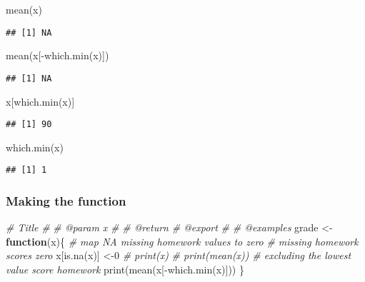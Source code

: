 \documentclass[
]{article}
\newenvironment{Shaded}{\begin{snugshade}}{\end{snugshade}}
\newcommand{\CommentTok}[1]{\textcolor[rgb]{0.56,0.35,0.01}{\textit{#1}}}
\newcommand{\ControlFlowTok}[1]{\textcolor[rgb]{0.13,0.29,0.53}{\textbf{#1}}}
\newcommand{\DecValTok}[1]{\textcolor[rgb]{0.00,0.00,0.81}{#1}}
\newcommand{\FunctionTok}[1]{\textcolor[rgb]{0.00,0.00,0.00}{#1}}
\newcommand{\NormalTok}[1]{#1}
\newcommand{\OtherTok}[1]{\textcolor[rgb]{0.56,0.35,0.01}{#1}}
\newcommand{\SpecialCharTok}[1]{\textcolor[rgb]{0.00,0.00,0.00}{#1}}
\begin{document}
\begin{Shaded}
\begin{Highlighting}[]
\FunctionTok{mean}\NormalTok{(x)}
\end{Highlighting}
\end{Shaded}

\begin{verbatim}
## [1] NA
\end{verbatim}

\begin{Shaded}
\begin{Highlighting}[]
\FunctionTok{mean}\NormalTok{(x[}\SpecialCharTok{{-}}\FunctionTok{which.min}\NormalTok{(x)])}
\end{Highlighting}
\end{Shaded}

\begin{verbatim}
## [1] NA
\end{verbatim}

\begin{Shaded}
\begin{Highlighting}[]
\NormalTok{x[}\FunctionTok{which.min}\NormalTok{(x)]}
\end{Highlighting}
\end{Shaded}

\begin{verbatim}
## [1] 90
\end{verbatim}

\begin{Shaded}
\begin{Highlighting}[]
\FunctionTok{which.min}\NormalTok{(x)}
\end{Highlighting}
\end{Shaded}

\begin{verbatim}
## [1] 1
\end{verbatim}

\hypertarget{making-the-function}{%
\subsubsection{Making the function}\label{making-the-function}}

\begin{Shaded}
\begin{Highlighting}[]
\CommentTok{\#\textquotesingle{} Title}
\CommentTok{\#\textquotesingle{}}
\CommentTok{\#\textquotesingle{} @param x }
\CommentTok{\#\textquotesingle{}}
\CommentTok{\#\textquotesingle{} @return}
\CommentTok{\#\textquotesingle{} @export}
\CommentTok{\#\textquotesingle{}}
\CommentTok{\#\textquotesingle{} @examples}
\NormalTok{grade }\OtherTok{\textless{}{-}} \ControlFlowTok{function}\NormalTok{(x)\{}
\CommentTok{\# map NA missing homework values to zero }
\CommentTok{\# missing homework scores zero}
\NormalTok{  x[}\FunctionTok{is.na}\NormalTok{(x)] }\OtherTok{\textless{}{-}}\DecValTok{0}
\CommentTok{\#  print(x)}
\CommentTok{\# print(mean(x)) }
  \CommentTok{\# excluding the lowest value score homework}
  \FunctionTok{print}\NormalTok{(}\FunctionTok{mean}\NormalTok{(x[}\SpecialCharTok{{-}}\FunctionTok{which.min}\NormalTok{(x)]))}
\NormalTok{\}}
\end{Highlighting}
\end{Shaded}
\end{document}
